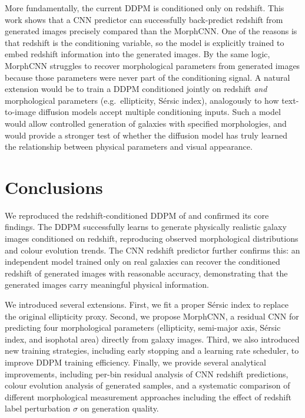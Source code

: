 \documentclass[fleqn,usenatbib]{mnras}
\begin{document}
More fundamentally, the current DDPM is conditioned only on
redshift.
This work shows that a CNN predictor can successfully back-predict
redshift from generated images precisely compared than the MorphCNN. One of the reasons is that redshift is the
conditioning variable, so the model is explicitly trained to embed
redshift information into the generated images.
By the same logic, MorphCNN struggles to recover morphological
parameters from generated images because those parameters were
never part of the conditioning signal.
A natural extension would be to train a DDPM conditioned jointly
on redshift \textit{and} morphological parameters (e.g.\ ellipticity,
S\'{e}rsic index), analogously to how text-to-image diffusion models
accept multiple conditioning inputs.
Such a model would allow controlled generation of galaxies with
specified morphologies, and would provide a stronger test of whether
the diffusion model has truly learned the relationship between
physical parameters and visual appearance.

\section{Conclusions}

We reproduced the redshift-conditioned DDPM of \citet{lizarraga2024}
and confirmed its core findings.
The DDPM successfully learns to generate physically realistic galaxy
images conditioned on redshift, reproducing observed morphological
distributions and colour evolution trends.
The CNN redshift predictor further confirms this: an independent model
trained only on real galaxies can recover the conditioned redshift of
generated images with reasonable accuracy, demonstrating that the
generated images carry meaningful physical information.

We introduced several extensions.
First, we fit a proper S\'{e}rsic index to replace the original
ellipticity proxy.
Second, we propose MorphCNN, a residual CNN for predicting four
morphological parameters (ellipticity, semi-major axis, S\'{e}rsic
index, and isophotal area) directly from galaxy images.
Third, we also introduced new training strategies, including early stopping and a
learning rate scheduler, to improve DDPM training efficiency.
Finally, we provide several analytical improvements, including per-bin
residual analysis of CNN redshift predictions, colour evolution
analysis of generated samples, and a systematic comparison of
different morphological measurement approaches including the effect
of redshift label perturbation $\sigma$ on generation quality.
\end{document}
